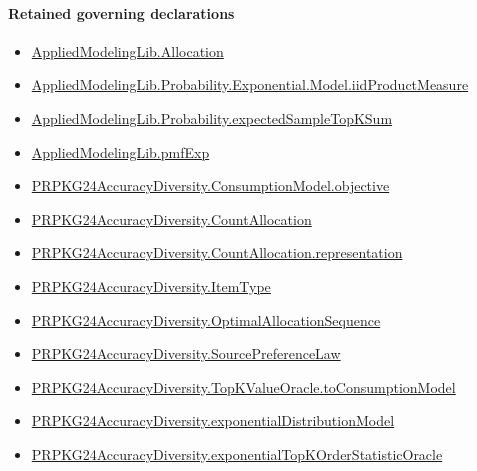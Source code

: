 \documentclass[10pt]{article}
\begin{document}
\paragraph{Retained governing declarations}
\begin{itemize}\raggedright
\item \hyperlink{governing-declaration-6972368b41f26c5a}{Applied\allowbreak{}Modeling\allowbreak{}Lib.\allowbreak{}Allocation}
\item \hyperlink{governing-declaration-58b69b75936abf60}{Applied\allowbreak{}Modeling\allowbreak{}Lib.\allowbreak{}Probability.\allowbreak{}Exponential.\allowbreak{}Model.\allowbreak{}iid\allowbreak{}Product\allowbreak{}Measure}
\item \hyperlink{governing-declaration-ce2e2b3f3ae2c88d}{Applied\allowbreak{}Modeling\allowbreak{}Lib.\allowbreak{}Probability.\allowbreak{}expected\allowbreak{}Sample\allowbreak{}Top\allowbreak{}K\allowbreak{}Sum}
\item \hyperlink{governing-declaration-8e4b4389a4f6454b}{Applied\allowbreak{}Modeling\allowbreak{}Lib.\allowbreak{}pmf\allowbreak{}Exp}
\item \hyperlink{governing-declaration-3ab045ef5e79a864}{PRPKG24\allowbreak{}Accuracy\allowbreak{}Diversity.\allowbreak{}Consumption\allowbreak{}Model.\allowbreak{}objective}
\item \hyperlink{governing-declaration-4fbd8fa467bd5d78}{PRPKG24\allowbreak{}Accuracy\allowbreak{}Diversity.\allowbreak{}Count\allowbreak{}Allocation}
\item \hyperlink{paper-prerequisite-29fb13a9ce74aef5}{PRPKG24\allowbreak{}Accuracy\allowbreak{}Diversity.\allowbreak{}Count\allowbreak{}Allocation.\allowbreak{}representation}
\item \hyperlink{governing-declaration-562ef32e180a12be}{PRPKG24\allowbreak{}Accuracy\allowbreak{}Diversity.\allowbreak{}Item\allowbreak{}Type}
\item \hyperlink{governing-declaration-98821e74d0c4230b}{PRPKG24\allowbreak{}Accuracy\allowbreak{}Diversity.\allowbreak{}Optimal\allowbreak{}Allocation\allowbreak{}Sequence}
\item \hyperlink{governing-declaration-e662f313179ba80f}{PRPKG24\allowbreak{}Accuracy\allowbreak{}Diversity.\allowbreak{}Source\allowbreak{}Preference\allowbreak{}Law}
\item \hyperlink{governing-declaration-588a2f7919921f81}{PRPKG24\allowbreak{}Accuracy\allowbreak{}Diversity.\allowbreak{}Top\allowbreak{}K\allowbreak{}Value\allowbreak{}Oracle.\allowbreak{}to\allowbreak{}Consumption\allowbreak{}Model}
\item \hyperlink{governing-declaration-50b1da7b92c4bb45}{PRPKG24\allowbreak{}Accuracy\allowbreak{}Diversity.\allowbreak{}exponential\allowbreak{}Distribution\allowbreak{}Model}
\item \hyperlink{governing-declaration-d8497abe2c9d995d}{PRPKG24\allowbreak{}Accuracy\allowbreak{}Diversity.\allowbreak{}exponential\allowbreak{}Top\allowbreak{}K\allowbreak{}Order\allowbreak{}Statistic\allowbreak{}Oracle}
\end{itemize}
\end{document}
